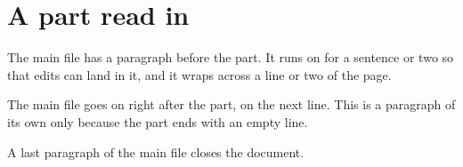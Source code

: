 \documentclass{article}
\begin{document}
\section{A part read in}

The main file has a paragraph before the part. It runs on for a sentence or two so that edits can land in it, and
it wraps across a line or two of the page.


The main file goes on right after the part, on the next line. This is a paragraph of its own only because the
part ends with an empty line.

A last paragraph of the main file closes the document.
\end{document}
